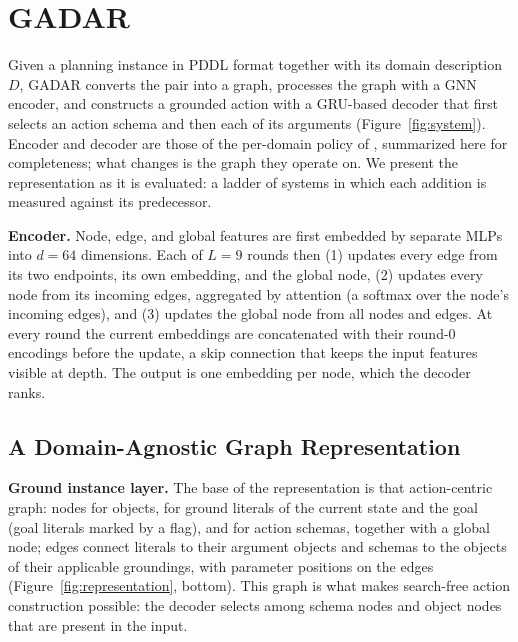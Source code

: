\documentclass[letterpaper]{article} %
\newcommand{\gadar}{GADAR}                 %
\begin{document}
\section{GADAR}

Given a planning instance in PDDL format together with its domain
description $D$, \gadar{} converts the pair into a graph, processes the
graph with a GNN encoder, and constructs a grounded action with a GRU-based
decoder that first selects an action schema and then each of its arguments
(Figure~\ref{fig:system}). Encoder and decoder are those of the per-domain
policy of \citet{gabar}, summarized here for completeness; what changes is
the graph they operate on. We present the representation as it is
evaluated: a ladder of systems in which each addition is measured against
its predecessor.

\textbf{Encoder.} Node, edge, and global features are first embedded by
separate MLPs into $d{=}64$ dimensions. Each of $L{=}9$ rounds then (1)
updates every edge from its two endpoints, its own embedding, and the global
node, (2) updates every node from its incoming edges, aggregated by
attention (a softmax over the node's incoming edges), and (3) updates the
global node from all nodes and edges. At every round the current embeddings
are concatenated with their round-0 encodings before the update, a skip
connection that keeps the input features visible at depth. The output is
one embedding per node, which the decoder ranks.

\subsection{A Domain-Agnostic Graph Representation}

\textbf{Ground instance layer.} The base of the representation is that
action-centric graph: nodes for objects, for ground literals
of the current state and the goal (goal literals marked by a flag), and for
action schemas, together with a global node; edges connect literals to their
argument objects and schemas to the objects of their applicable groundings,
with parameter positions on the edges (Figure~\ref{fig:representation},
bottom). This graph is what makes search-free action construction possible:
the decoder selects among schema nodes and object nodes that are present in
the input.
\end{document}
